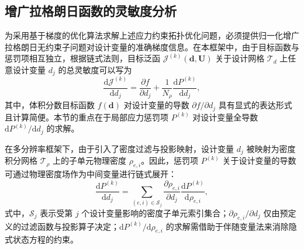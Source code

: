 \subsection{增广拉格朗日函数的灵敏度分析}
\label{subsec:al_sensitivity}

为采用基于梯度的优化算法求解上述应力约束拓扑优化问题，必须提供归一化增广拉格朗日无约束子问题对设计变量的准确梯度信息。在本框架中，由于目标函数与惩罚项相互独立，根据链式法则，目标泛函 $\mathcal{J}^{(k)}(\boldsymbol{d}, \boldsymbol{U})$ 关于设计网格 $\mathcal{T}_d$ 上任意设计变量 $d_j$ 的总灵敏度可以写为
\[
\frac{\mathrm{d}\mathcal{J}^{(k)}}{\mathrm{d}d_j} = \frac{\partial f}{\partial d_j} + \frac{1}{N_\rho} \frac{\mathrm{d}P^{(k)}}{\mathrm{d}d_j},
\]
其中，体积分数目标函数 $f(\boldsymbol{d})$ 对设计变量的导数 $\partial f/\partial d_j$ 具有显式的表达形式且计算简便。本节的重点在于局部应力惩罚项 $P^{(k)}$ 对设计变量全导数 $\mathrm{d}P^{(k)}/\mathrm{d}d_j$ 的求解。

在多分辨率框架下，由于引入了密度过滤与投影映射，设计变量 $d_j$ 被映射为密度积分网格 $\mathcal{T}_\rho$ 上的子单元物理密度 $\rho_{e,i}$。因此，惩罚项 $P^{(k)}$ 关于设计变量的导数可通过物理密度场作为中间变量进行链式展开：
\[
\frac{\mathrm{d}P^{(k)}}{\mathrm{d}d_j} = \sum_{(e,i) \in \mathcal{S}_j} \frac{\partial \rho_{e,i}}{\partial d_j} \frac{\mathrm{d}P^{(k)}}{\mathrm{d}\rho_{e,i}},
\]
式中，$\mathcal{S}_j$ 表示受第 $j$ 个设计变量影响的密度子单元索引集合；$\partial \rho_{e,i}/\partial d_j$ 仅由预定义的过滤函数与投影算子决定；$\mathrm{d}P^{(k)}/\mathrm{d}\rho_{e,i}$ 的求解需借助于伴随变量法来消除隐式状态方程的约束。

